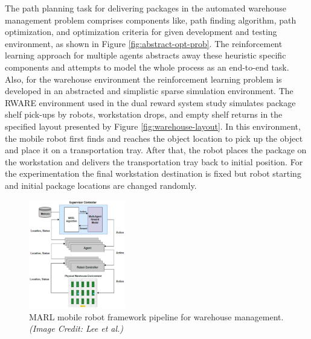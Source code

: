 \documentclass{article}
\begin{document}
The path planning task for delivering packages in the automated warehouse management problem comprises components like, path finding algorithm, path optimization, and optimization criteria for given development and testing environment, as shown in Figure \ref{fig:abstract-opt-prob}.
The reinforcement learning approach for multiple agents abstracts away these heuristic specific components and attempts to model the whole process as an end-to-end task.
Also, for the warehouse environment the reinforcement learning problem is developed in an abstracted and simplistic sparse simulation environment.
The RWARE environment used in the dual reward system study simulates package shelf pick-ups by robots, workstation drops, and empty shelf returns in the specified layout presented by Figure \ref{fig:warehouse-layout}.
In this environment, the mobile robot first finds and reaches the object location to pick up the object and place it on a transportation tray.
After that, the robot places the package on the workstation and delivers the transportation tray back to initial position.
For the experimentation the final workstation destination is fixed but robot starting and initial package locations are changed randomly.






\begin{figure}[h]
    \centering
    \includegraphics[width=0.375\textwidth]{reward-shaping-pipeline.png}
    \caption{MARL mobile robot framework pipeline for warehouse management. \textit{(Image Credit: Lee et al.)}}
    \label{fig:reward-shaping-pipeline}
\end{figure}
\end{document}
